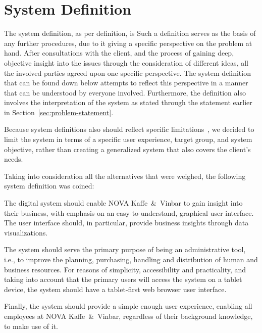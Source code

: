 \section{System Definition}\label{sec:system-definition}

The system definition, as per definition, is
Such a definition serves as the basis of any further procedures, due to it giving a specific perspective on the problem
at hand.
After consultations with the client, and the process of gaining deep, objective insight into the issues through the
consideration of different ideas, all the involved parties agreed upon one specific perspective.
The system definition that can be found down below attempts to reflect this perspective in a manner that can be
understood by everyone involved.
Furthermore, the definition also involves the interpretation of the system as stated through the statement earlier in
Section~\ref{sec:problem-statement}.

Because system definitions also should reflect specific limitations~\cite[38]{mathiassen2018}, we decided to limit the
system in terms of a specific user experience, target group, and system objective, rather than creating a generalized
system that also covers the client's needs.

Taking into consideration all the alternatives that were weighed, the following system definition was coined:
\begin{tcolorbox}[title=System definition]
    The digital system should enable NOVA Kaffe~\&~Vinbar to gain insight into their business, with emphasis on an
    easy-to-understand, graphical user interface.
    The user interface should, in particular, provide business insights through data visualizations.

    The system should serve the primary purpose of being an administrative tool, i.e., to improve the planning,
    purchasing, handling and distribution of human and business resources.
    For reasons of simplicity, accessibility and practicality, and taking into account that the primary users will
    access the system on a tablet device, the system should have a tablet-first web browser user interface.

    Finally, the system should provide a simple enough user experience, enabling all employees at NOVA Kaffe~\&~Vinbar,
    regardless of their background knowledge, to make use of it.
\end{tcolorbox}
